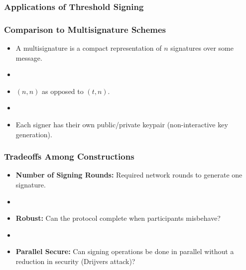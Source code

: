 \documentclass[hyperref={pdfpagelabels=true},table,dvipsnames,14pt,aspectratio=169]{beamer}
\begin{document}
\begin{frame}
  \frametitle{Applications of Threshold Signing}
  \begin{itemize}
  \end{itemize}
\end{frame}

\begin{frame}
  \frametitle{Comparison to Multisignature Schemes}
  \centering

  \begin{itemize}
    \item<1->  A multisignature is a compact representation of $n$ signatures
      over some message.
    \item[]
    \item<2-> $(n,n)$ as opposed to $(t,n)$.
    \item[]
    \item<3-> Each signer has their own public/private keypair (non-interactive key generation).
  \end{itemize}
\end{frame}

\begin{frame}
  \frametitle{Tradeoffs Among Constructions}

  \begin{itemize}
    \item<1-> \textbf{Number of Signing Rounds:} Required network rounds to
      generate one signature.
    \item[]
    \item<2-> \textbf{Robust:} Can the protocol complete when participants
      misbehave?
    \item[]
    \item<3-> \textbf{Parallel Secure:} Can signing operations be done in
      parallel without a reduction in security (Drijvers attack)?
  \end{itemize}
\end{frame}
\end{document}
